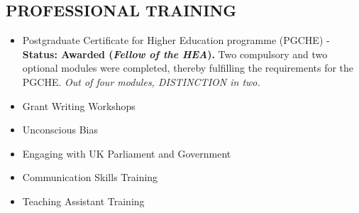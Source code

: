 \documentclass[margin]{res}
\begin{document}
\begin{resume}
\section{PROFESSIONAL TRAINING}
\begin{itemize}\itemsep -10pt
\item Postgraduate Certificate for Higher Education programme (PGCHE) - \textbf{Status: Awarded (\textit{Fellow of the HEA}).} Two compulsory and two optional modules were completed, thereby fulfilling the requirements for the PGCHE. \textit{Out of four modules, DISTINCTION in two.} \\
\item Grant Writing Workshops \\
\item Unconscious Bias \\
\item Engaging with UK Parliament and Government \\
\item Communication Skills Training\\
\item Teaching Assistant Training
\end{itemize}


\end{resume}
\end{document}
